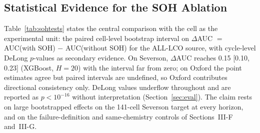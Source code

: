 \documentclass[preprint,12pt]{elsarticle}
\begin{document}
\subsection{Statistical Evidence for the SOH Ablation}
Table~\ref{tab:sohtests} states the central comparison with the cell as the experimental unit: the paired cell-level bootstrap interval on $\Delta$AUC $=$ AUC(with SOH) $-$ AUC(without SOH) for the ALL-LCO source, with cycle-level DeLong $p$-values as secondary evidence. On Severson, $\Delta$AUC reaches 0.15 [0.10, 0.23] (XGBoost, $H{=}20$) with the interval far from zero; on Oxford the point estimates agree but paired intervals are undefined, so Oxford contributes directional consistency only. DeLong values underflow throughout and are reported as $p{<}10^{-16}$ without interpretation (Section~\ref{sec:eval}). The claim rests on large bootstrapped effects on the 141-cell Severson target at every horizon, and on the failure-definition and same-chemistry controls of Sections~III-F and~III-G.
\end{document}
